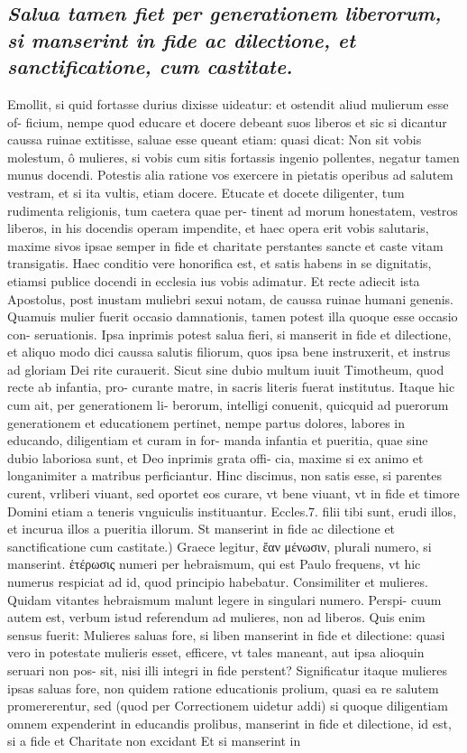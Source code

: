 \documentclass{article}
\begin{document}
\begin{pages}
\subsection*{\textit{Salua tamen fiet per generationem liberorum, si manserint in fide ac dilectione, et sanctificatione, cum castitate. }}\pstart Emollit, si quid fortasse durius dixisse uideatur: et ostendit aliud mulierum esse of- ficium, nempe quod educare et docere debeant suos liberos et sic si dicantur caussa ruinae extitisse, saluae esse queant etiam: quasi dicat: Non sit vobis molestum, ô mulieres, si vobis cum sitis fortassis ingenio pollentes, negatur tamen munus docendi. Potestis alia ratione vos exercere in pietatis operibus ad salutem vestram, et si ita vultis, etiam docere. Etucate et docete diligenter, tum rudimenta religionis, tum caetera quae per- tinent ad morum honestatem, vestros liberos, in his docendis operam impendite, et haec opera erit vobis salutaris, maxime sivos ipsae semper in fide et charitate perstantes sancte et caste vitam transigatis. Haec conditio vere honorifica est, et satis habens in se dignitatis, etiamsi publice docendi in ecclesia ius vobis adimatur. Et recte adiecit ista Apostolus, post inustam muliebri sexui notam, de caussa ruinae humani genenis. Quamuis mulier fuerit occasio damnationis, tamen potest illa quoque  esse occasio con- seruationis. Ipsa inprimis potest salua fieri, si manserit in fide et dilectione, et aliquo modo dici caussa salutis filiorum, quos ipsa bene instruxerit, et instrus ad gloriam Dei rite curauerit. Sicut sine dubio multum iuuit Timotheum, quod recte ab infantia, pro- curante matre, in sacris literis fuerat institutus. Itaque hic cum ait, per generationem li- berorum, intelligi conuenit, quicquid ad puerorum generationem et educationem pertinet, nempe partus dolores, labores in educando, diligentiam et curam in for- manda infantia et pueritia, quae sine dubio laboriosa sunt, et Deo inprimis grata offi- cia, maxime si ex animo et longanimiter a matribus perficiantur. Hinc discimus, non satis esse, si parentes curent, vrliberi viuant, sed oportet eos curare, vt bene viuant, vt in fide et timore Domini etiam a teneris vnguiculis instituantur. Eccles.7. filii tibi sunt, erudi illos, et incurua illos a pueritia illorum.  \pend\pstart St manserint in fide ac dilectione et sanctificatione cum castitate.) Graece legitur, ἔαν μένωσιν, plurali numero, si manserint. ἑτέρωσις numeri per hebraismum, qui est Paulo frequens, vt hic numerus respiciat ad id, quod principio habebatur. Consimiliter et mulieres. Quidam vitantes hebraismum malunt legere in singulari numero. Perspi- cuum autem est, verbum istud referendum ad mulieres, non ad liberos. Quis enim sensus fuerit: Mulieres saluas fore, si liben manserint in fide et dilectione: quasi vero in potestate mulieris esset, efficere, vt tales maneant, aut ipsa alioquin seruari non pos- sit, nisi illi integri in fide perstent? Significatur itaque mulieres ipsas saluas fore, non quidem ratione educationis prolium, quasi ea re salutem promererentur, sed (quod per Correctionem uidetur addi) si quoque  diligentiam omnem expenderint in educandis prolibus, manserint in fide et dilectione, id est, si a fide et Charitate non excidant Et si manserint in 
\end{pages}
\end{document}
